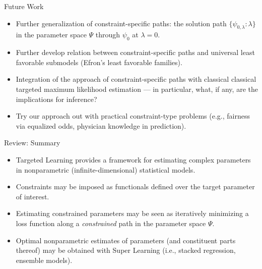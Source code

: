 \documentclass[12pt,t]{beamer}
\begin{document}
\begin{frame}[c]{Future Work}

\begin{center}
\begin{itemize}
  \itemsep12pt
  \item Further generalization of constraint-specific paths: the solution path
    $\{\psi_{0, \lambda}: \lambda\}$ in the parameter space $\Psi$ through
    $\psi_0$ at $\lambda = 0$.
  \item Further develop relation between constraint-specific paths and universal
    least favorable submodels (Efron's least favorable families).
  \item Integration of the approach of constraint-specific paths with classical
    classical targeted maximum likelihood estimation --- in particular, what, if
    any, are the implications for inference?
  \item Try our approach out with practical constraint-type problems (e.g.,
    fairness via equalized odds, physician knowledge in prediction).
\end{itemize}
\end{center}

\note{
}

\end{frame}


\begin{frame}[c]{Review: Summary}

\begin{center}
\begin{itemize}
  \itemsep12pt
  \item Targeted Learning provides a framework for estimating complex parameters
    in nonparametric (infinite-dimensional) statistical models.
  \item Constraints may be imposed as functionals defined over the target
    parameter of interest.
  \item Estimating constrained parameters may be seen as iteratively minimizing
    a loss function along a \textit{constrained} path in the parameter space
    $\Psi$.
  \item Optimal nonparametric estimates of parameters (and constituent parts
    thereof) may be obtained with Super Learning (i.e., stacked regression,
    ensemble models).
\end{itemize}
\end{center}


\end{frame}
\end{document}
